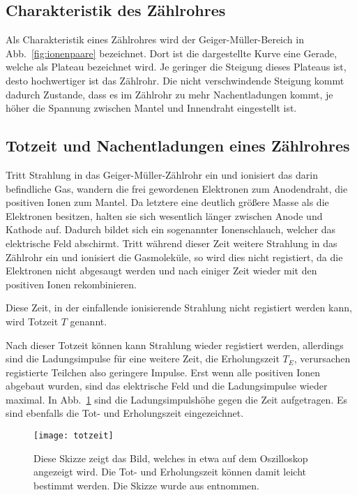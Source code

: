 \subsection{Charakteristik des Zählrohres}
%

Als Charakteristik eines Zählrohres wird der Geiger-Müller-Bereich in 
Abb.~\ref{fig:ionenpaare} bezeichnet. Dort ist die dargestellte Kurve eine
Gerade, welche als Plateau bezeichnet wird. Je geringer die Steigung dieses
Plateaus ist, desto hochwertiger ist das Zählrohr. Die nicht verschwindende Steigung
kommt dadurch Zustande, dass es im Zählrohr zu mehr Nachentladungen kommt,
je höher die Spannung zwischen Mantel und Innendraht eingestellt ist.
%
\subsection{Totzeit und Nachentladungen eines Zählrohres}
%

Tritt Strahlung in das Geiger-Müller-Zählrohr ein und ionisiert das darin befindliche Gas, 
wandern die frei gewordenen Elektronen zum Anodendraht, die positiven Ionen zum
Mantel. Da letztere eine deutlich größere Masse als die Elektronen besitzen, halten sie sich 
wesentlich länger zwischen Anode und Kathode auf. Dadurch bildet sich ein sogenannter 
Ionenschlauch, welcher das elektrische Feld abschirmt. Tritt während dieser Zeit weitere Strahlung 
in das Zählrohr ein und ionisiert die Gasmoleküle, so wird dies nicht registiert, da die Elektronen 
nicht abgesaugt werden und nach einiger Zeit wieder mit den positiven Ionen rekombinieren.

Diese Zeit, in der einfallende ionisierende Strahlung nicht registiert werden kann, wird Totzeit 
$T$ genannt.

Nach dieser Totzeit können kann Strahlung wieder registiert werden, allerdings sind die Ladungsimpulse 
für eine weitere Zeit, die Erholungszeit $T_E$, verursachen registierte Teilchen also geringere Impulse.
Erst wenn alle positiven Ionen abgebaut wurden, sind das elektrische Feld und die Ladungsimpulse 
wieder maximal.
In Abb.~\ref{fig:totzeit} sind die Ladungsimpulshöhe gegen die Zeit aufgetragen. Es sind ebenfalls
die Tot- und Erholungszeit eingezeichnet.
%
\begin{figure}[h!]
  \centering
  \texttt{[image: totzeit]}
  \caption{Diese Skizze zeigt das Bild, welches in etwa
               auf dem Oszilloskop angezeigt wird. Die Tot- und
                Erholungszeit können damit leicht bestimmt werden.
                Die Skizze wurde aus \textcite{v703} entnommen.}
  \label{fig:totzeit}
\end{figure}
%

